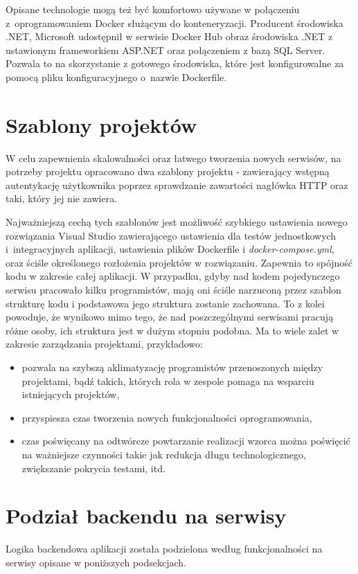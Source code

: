 \documentclass{SGGW-thesis}
\begin{document}
  Opisane technologie mogą też być komfortowo używane w połączeniu z~oprogramowaniem Docker służącym do konteneryzacji. Producent środowiska .NET, Microsoft udostępnił w serwisie Docker Hub obraz środowiska .NET z ustawionym frameworkiem ASP.NET oraz połączeniem z bazą SQL Server. Pozwala to na skorzystanie z gotowego środowiska, które jest konfigurowalne za pomocą pliku konfiguracyjnego o~nazwie Dockerfile.

  \section{Szablony projektów}
  W celu zapewnienia skalowalności oraz łatwego tworzenia nowych serwisów, na potrzeby projektu opracowano dwa szablony projektu - zawierający wstępną autentykację użytkownika poprzez sprawdzanie zawartości nagłówka HTTP oraz taki, który jej nie zawiera.

  Najważniejszą cechą tych szablonów jest możliwość szybkiego ustawienia nowego rozwiązania Visual Studio zawierającego ustawienia dla testów jednostkowych i~integracyjnych aplikacji, ustawienia plików Dockerfile i \textit{docker-compose.yml}, oraz ściśle określonego rozłożenia projektów w rozwiązaniu. Zapewnia to spójność kodu w zakresie całej aplikacji. W przypadku, gdyby nad kodem pojedynczego serwisu pracowało kilku programistów, mają oni ściśle narzuconą przez szablon strukturę kodu i podstawowa jego struktura zostanie zachowana. To z kolei powoduje, że wynikowo mimo tego, że nad poszczególnymi serwisami pracują różne osoby, ich struktura jest w dużym stopniu podobna. Ma to wiele zalet w zakresie zarządzania projektami, przykładowo:

  \begin{itemize}
    \item pozwala na szybszą aklimatyzację programistów przenoszonych między projektami, bądź takich, których rola w zespole pomaga na wsparciu istniejących projektów,
    \item przyspiesza czas tworzenia nowych funkcjonalności oprogramowania,
    \item czas poświęcany na odtwórcze powtarzanie realizacji wzorca można poświęcić na ważniejsze czynności takie jak redukcja długu technologicznego, zwiększanie pokrycia testami, itd.
  \end{itemize}

  \section{Podział backendu na serwisy}
    Logika backendowa aplikacji została podzielona według funkcjonalności na serwisy opisane w poniższych podsekcjach.
\end{document}
